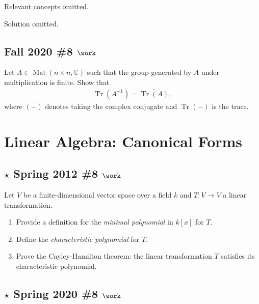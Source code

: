 
Relevant concepts omitted.

Solution omitted.

\hypertarget{fall-2020-8-work}{%
\subsection{\texorpdfstring{Fall 2020 \#8
\(\work\)}{Fall 2020 \#8 \textbackslash work}}\label{fall-2020-8-work}}

Let \(A\in \operatorname{Mat}(n\times n, {\mathbb{C}})\) such that the
group generated by \(A\) under multiplication is finite. Show that
\begin{align*}
\operatorname{Tr}(A^{-1}) ={\overline{{\operatorname{Tr}(A) }}}
,\end{align*}
where \({\overline{{({-})}}}\) denotes taking the complex conjugate and
\(\operatorname{Tr}({-})\) is the trace.

\hypertarget{linear-algebra-canonical-forms}{%
\section{Linear Algebra: Canonical
Forms}\label{linear-algebra-canonical-forms}}

\hypertarget{star-spring-2012-8-work}{%
\subsection{\texorpdfstring{\(\star\) Spring 2012 \#8
\(\work\)}{\textbackslash star Spring 2012 \#8 \textbackslash work}}\label{star-spring-2012-8-work}}

Let \(V\) be a finite-dimensional vector space over a field \(k\) and
\(T:V\to V\) a linear transformation.

\begin{enumerate}
\def\labelenumi{\alph{enumi}.}
\item
  Provide a definition for the \emph{minimal polynomial} in \(k[x]\) for
  \(T\).
\item
  Define the \emph{characteristic polynomial} for \(T\).
\item
  Prove the Cayley-Hamilton theorem: the linear transformation \(T\)
  satisfies its characteristic polynomial.
\end{enumerate}

\hypertarget{star-spring-2020-8-work}{%
\subsection{\texorpdfstring{\(\star\) Spring 2020 \#8
\(\work\)}{\textbackslash star Spring 2020 \#8 \textbackslash work}}\label{star-spring-2020-8-work}}

